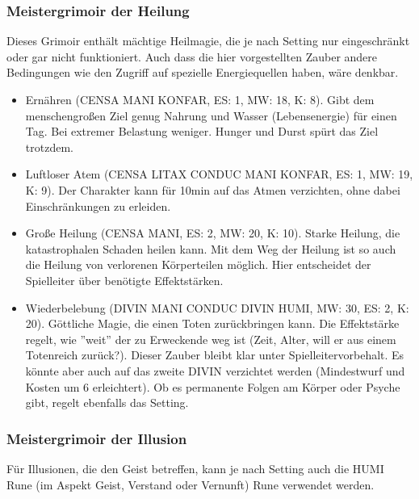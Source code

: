 \documentclass{article}
\begin{document}
\subsubsection{Meistergrimoir der Heilung}

Dieses Grimoir enthält mächtige Heilmagie, die je nach Setting nur eingeschränkt oder gar nicht funktioniert. Auch dass
die hier vorgestellten Zauber andere Bedingungen wie den Zugriff auf spezielle Energiequellen haben, wäre denkbar.

\begin{itemize}
\item Ernähren (CENSA MANI KONFAR, ES: 1, MW: 18, K: 8). Gibt dem menschengroßen Ziel genug Nahrung und Wasser (Lebensenergie) für einen Tag. Bei extremer Belastung weniger. Hunger und Durst spürt das Ziel trotzdem.
\item Luftloser Atem (CENSA LITAX CONDUC MANI KONFAR, ES: 1, MW: 19, K: 9). Der Charakter kann für 10min auf das Atmen verzichten, ohne dabei Einschränkungen zu erleiden.
\item Große Heilung (CENSA MANI, ES: 2, MW: 20, K: 10). Starke Heilung, die katastrophalen Schaden heilen kann. Mit dem Weg der Heilung ist so auch die Heilung von verlorenen Körperteilen möglich. Hier entscheidet der Spielleiter über benötigte Effektstärken.
\item Wiederbelebung (DIVIN MANI CONDUC DIVIN HUMI, MW: 30, ES: 2, K: 20). Göttliche Magie, die einen Toten zurückbringen kann. Die Effektstärke regelt, wie ''weit'' der zu Erweckende weg ist (Zeit, Alter, will er aus einem Totenreich zurück?). Dieser Zauber bleibt klar unter Spielleitervorbehalt. Es könnte aber auch auf das zweite DIVIN verzichtet werden (Mindestwurf und Kosten um 6 erleichtert). Ob es permanente Folgen am Körper oder Psyche gibt, regelt ebenfalls das Setting.
\end{itemize}

\subsubsection{Meistergrimoir der Illusion}

Für Illusionen, die den Geist betreffen, kann je nach Setting auch die HUMI Rune (im Aspekt Geist, Verstand oder
Vernunft) Rune verwendet werden.
\end{document}
